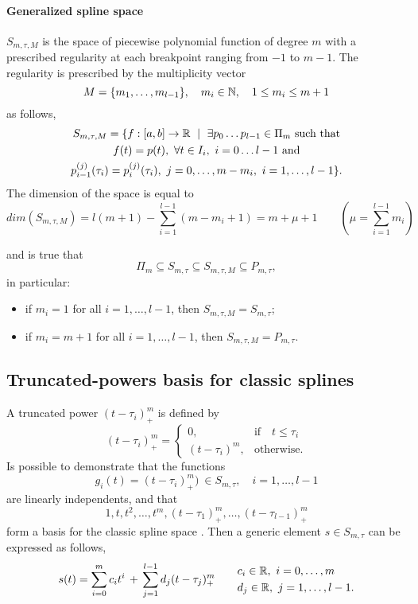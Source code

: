 \documentclass[dissertation.tex]{subfiles}
\begin{document}
\paragraph{Generalized spline space} $S_{m,\tau,M}$ is the
space of piecewise polynomial function of degree $m$ with a prescribed
regularity at each breakpoint ranging from $-1$ to $m-1$. The
regularity is prescribed by the multiplicity vector
$$
M=\{m_1,\dots,m_{l-1}\},\quad m_i\in\mathbb{N},\quad 1\leq m_i\leq m+1
$$
as follows,
\begin{multline*}
  S_{m,\tau,M}=\{f:[a,b]\rightarrow\mR\ \mid\ \exists p_0\dots
  p_{l-1}\in\Pi_m \ \text{such that}\\
  f(t)=p(t),\ \forall t\in I_i,\
  i=0\dots l-1\ \text{and}\\
  p_{i-1}^{(j)}(\tau_i)=p_{i}^{(j)}(\tau_i),\ j=0,\dots,m-m_i,\ i=1,\dots,l-1\}.
\end{multline*}
The dimension of the space is equal to 
\begin{equation*}
  dim(S_{m,\tau,M})=l(m+1)-\sum_{i=1}^{l-1}(m-m_i+1)=m+\mu +1\qquad(\mu=\sum_{i=1}^{l-1}m_i)  
\end{equation*}

and is true that
$$
\Pi_m\subseteq S_{m,\tau}\subseteq S_{m,\tau,M}\subseteq P_{m,\tau},
$$
in particular:
\begin{itemize}
  \item if $m_i=1$ for all $i=1,\dots,l-1$, then
    $S_{m,\tau,M}=S_{m,\tau}$;
  \item if $m_i=m+1$ for all $i=1,\dots,l-1$, then
    $S_{m,\tau,M}=P_{m,\tau}$.
\end{itemize}

\subsection{Truncated-powers basis for classic
  splines}\label{sec:truncpow}
A truncated power $(t-\tau_i)_+^m$ is
defined by
$$
(t-\tau_i)_+^m=
\begin{cases}
  0,&\mbox{if}\quad t\leq\tau_i\\
  (t-\tau_i)^m, &\mbox{otherwise}.
\end{cases}
$$
Is possible to demonstrate that the functions
$$
g_i(t)=(t-\tau_i)_+^m)\ \in S_{m,\tau},\quad i=1,\dots,l-1
$$
are linearly independents, and that
$$
1,t,t^2,\dots,t^m,(t-\tau_1)_+^m,\dots,(t-\tau_{l-1})_+^m
$$
form a basis for the classic spline space \cite{deboor}. Then a
generic element $s\in S_{m,\tau}$ can be expressed as follows,
\begin{equation}\label{eq:classicSplineElement}
  s(t)=\sum_{i=0}^m c_i t^i\, +\, \sum_{j=1}^{l-1} d_j
  (t-\tau_j)_+^m\qquad
  \begin{split}
    &c_i\in\mathbb{R},\ i=0,\dots,m\\
    &d_j\in\mathbb{R},\ j=1,\dots,l-1.
  \end{split}
\end{equation}
\end{document}
